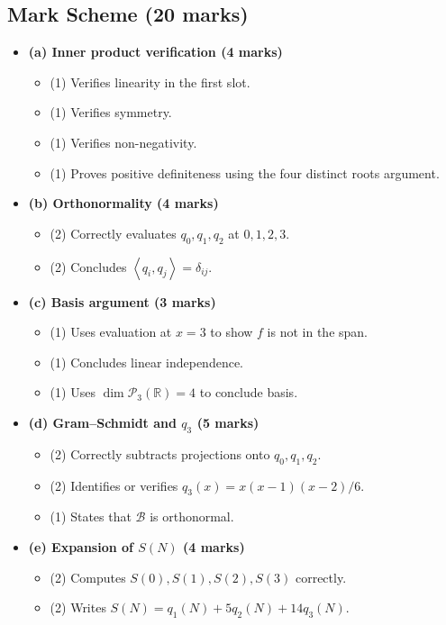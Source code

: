 \documentclass[12pt]{article}
\newcommand{\R}{\mathbb{R}}
\newcommand{\B}{\mathcal{B}}
\newcommand{\Ppoly}{\mathcal{P}}
\newcommand{\ip}[2]{\left\langle #1,#2\right\rangle}
\begin{document}
\subsection{Mark Scheme (20 marks)}
\begin{itemize}[leftmargin=1.6em]
  \item \textbf{(a) Inner product verification (4 marks)}
  \begin{itemize}[leftmargin=1.6em]
    \item (1) Verifies linearity in the first slot.
    \item (1) Verifies symmetry.
    \item (1) Verifies non-negativity.
    \item (1) Proves positive definiteness using the four distinct roots argument.
  \end{itemize}
  \item \textbf{(b) Orthonormality (4 marks)}
  \begin{itemize}[leftmargin=1.6em]
    \item (2) Correctly evaluates $q_0,q_1,q_2$ at $0,1,2,3$.
    \item (2) Concludes $\ip{q_i}{q_j}=\delta_{ij}$.
  \end{itemize}
  \item \textbf{(c) Basis argument (3 marks)}
  \begin{itemize}[leftmargin=1.6em]
    \item (1) Uses evaluation at $x=3$ to show $f$ is not in the span.
    \item (1) Concludes linear independence.
    \item (1) Uses $\dim\Ppoly_3(\R)=4$ to conclude basis.
  \end{itemize}
  \item \textbf{(d) Gram--Schmidt and $q_3$ (5 marks)}
  \begin{itemize}[leftmargin=1.6em]
    \item (2) Correctly subtracts projections onto $q_0,q_1,q_2$.
    \item (2) Identifies or verifies $q_3(x)=x(x-1)(x-2)/6$.
    \item (1) States that $\B$ is orthonormal.
  \end{itemize}
  \item \textbf{(e) Expansion of $S(N)$ (4 marks)}
  \begin{itemize}[leftmargin=1.6em]
    \item (2) Computes $S(0),S(1),S(2),S(3)$ correctly.
    \item (2) Writes $S(N)=q_1(N)+5q_2(N)+14q_3(N)$.
  \end{itemize}
\end{itemize}
\end{document}
